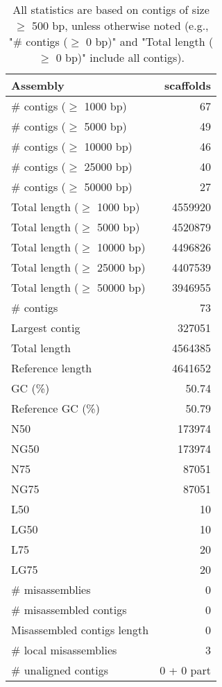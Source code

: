 \documentclass[12pt,a4paper]{article}
\begin{document}
\begin{table}[ht]
\begin{center}
\caption{All statistics are based on contigs of size $\geq$ 500 bp, unless otherwise noted (e.g., "\# contigs ($\geq$ 0 bp)" and "Total length ($\geq$ 0 bp)" include all contigs).}
\begin{tabular}{|l*{1}{|r}|}
\hline
Assembly & scaffolds \\ \hline
\# contigs ($\geq$ 1000 bp) & 67 \\ \hline
\# contigs ($\geq$ 5000 bp) & 49 \\ \hline
\# contigs ($\geq$ 10000 bp) & 46 \\ \hline
\# contigs ($\geq$ 25000 bp) & 40 \\ \hline
\# contigs ($\geq$ 50000 bp) & 27 \\ \hline
Total length ($\geq$ 1000 bp) & 4559920 \\ \hline
Total length ($\geq$ 5000 bp) & 4520879 \\ \hline
Total length ($\geq$ 10000 bp) & 4496826 \\ \hline
Total length ($\geq$ 25000 bp) & 4407539 \\ \hline
Total length ($\geq$ 50000 bp) & 3946955 \\ \hline
\# contigs & 73 \\ \hline
Largest contig & 327051 \\ \hline
Total length & 4564385 \\ \hline
Reference length & 4641652 \\ \hline
GC (\%) & 50.74 \\ \hline
Reference GC (\%) & 50.79 \\ \hline
N50 & 173974 \\ \hline
NG50 & 173974 \\ \hline
N75 & 87051 \\ \hline
NG75 & 87051 \\ \hline
L50 & 10 \\ \hline
LG50 & 10 \\ \hline
L75 & 20 \\ \hline
LG75 & 20 \\ \hline
\# misassemblies & 0 \\ \hline
\# misassembled contigs & 0 \\ \hline
Misassembled contigs length & 0 \\ \hline
\# local misassemblies & 3 \\ \hline
\# unaligned contigs & 0 + 0 part \\ \hline

\end{tabular}
\end{center}
\end{table}
\end{document}
